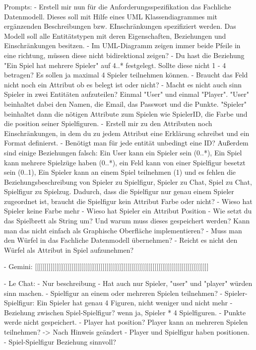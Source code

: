     Prompts:
        - Erstell mir nun für die Anforderungsspezifikation das Fachliche Datenmodell. Dieses soll mit Hilfe eines UML Klassendiagrammes mit ergänzenden Beschreibungen bzw. EInschränkungen spezifiziert werden. Das Modell soll alle Entitätstypen mit deren Eigenschaften, Beziehungen und Einschränkungen besitzen.
        - Im UML-Diagramm zeigen immer beide Pfeile in eine richtung, müssen diese nicht bidirektional zeigen?
        - Du hast die Beziehung "Ein Spiel hat mehrere Spieler" auf 4..* festgelegt. Sollte diese nicht 1 - 4 betragen? Es sollen ja maximal 4 Spieler teilnehmen können.
        - Braucht das Feld nicht noch ein Attribut ob es belegt ist oder nicht?
        - Macht es nicht auch sinn Spieler in zwei Entitäten aufzuteilen? Einmal "User" und einmal "Player".  "User" beinhaltet dabei den Namen, die Email, das Passwort und die Punkte. "Spieler" beinhaltet dann die nötigen Attribute zum Spielen wie SpielerID, die Farbe und die position seiner Spielfiguren.
        - Erstell mir zu den Attributen noch Einschränkungen, in dem du zu jedem Attribut eine Erklärung schreibst und ein Format definierst.
        - Benötigt man für jede entität unbedingt eine ID? Außerdem sind einige Beziehungen falsch: Ein User kann ein Spieler sein (0..*), Ein Spiel kann mehrere Spielzüge haben (0..*), ein Feld kann von einer Spielfigur besetzt sein (0..1), Ein Spieler kann an einem Spiel teilnehmen (1) und es fehlen die Beziehungsbeschreibung von Spieler zu Spielfigur, Spieler zu Chat, Spiel zu Chat, Spielfigur zu Spielzug. Dadurch, dass die Spielfigur nur genau einem Spieler zugeordnet ist, braucht die Spielfigur kein Attribut Farbe oder nicht?
        - Wieso hat Spieler keine Farbe mehr
        - Wieso hat Spieler ein Attribut Position
        - Wie setzt du das Spielbrett als String um? Und warum muss dieses gespeichert werden? Kann man das nicht einfach als Graphische Oberfläche implementieren?
        - Muss man den Würfel in das Fachliche Datenmodell übernehmen? 
        - Reicht es nicht den Würfel als Attribut in Spiel aufzunehmen?

        - Gemini: [[[[[[[[[[[[[[[[[[[[[[[[[[[[[[[[[[[[[[[[[[[[[]]]]]]]]]]]]]]]]]]]]]]]]]]]]]]]]]]]]]]]]]]]]]


- Le Chat:
    - Nur beschreibung
    - Hat auch nur Spieler, "user" und "player" würden sinn machen.
    - Spielfigur an einem oder mehreren Spielen teilnehmen?
    - Spieler-Spielfigur: Ein Spieler hat genau 4 Figuren, nicht weniger und nicht mehr
    - Beziehung zwischen Spiel-Spielfigur? wenn ja, Spieler * 4 Spielfiguren.
    - Punkte werde nicht gespeichert.
    - Player hat position? Player kann an mehreren Spielen teilnehmen? -> Nach Hinweis geändert
    - Player und Spielfigur haben positionen.
    - Spiel-Spielfigur Beziehung sinnvoll?


